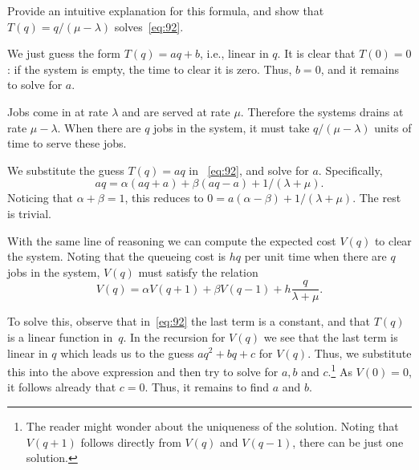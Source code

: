 \begin{exercise}
Provide an intuitive explanation for this formula, and show that $T(q)=q/(\mu-\lambda)$ solves~\cref{eq:92}. 
\begin{hint}
We just guess the form $T(q) = aq + b$, i.e., linear in $q$. It is clear that $T(0)=0$: if the system is empty, the time to clear it is zero. Thus, $b=0$, and it remains to solve for $a$. 
\end{hint}

\begin{solution}
  Jobs come in at rate $\lambda$ and are served at rate $\mu$.
  Therefore the systems drains at rate $\mu-\lambda$.
  When there are $q$ jobs in the system, it must take $q/(\mu-\lambda)$ units of time to serve these jobs.

  We substitute the guess $T(q) = aq$ in ~\cref{eq:92}, and solve for $a$. Specifically,
  \begin{equation*}
    a q = \alpha (aq + a) + \beta (a q - a) + 1/(\lambda+\mu). 
  \end{equation*}
Noticing that $\alpha + \beta = 1$, this reduces to $0 = a(\alpha - \beta) + 1/(\lambda + \mu)$. The rest is trivial.
\end{solution}
\end{exercise}


With the same line of reasoning we can compute the expected cost $V(q)$ to clear the system.
Noting that the queueing cost is $hq$ per unit time when there are $q$ jobs in the system, $V(q)$ must satisfy the relation
\begin{equation}\label{eq:93}
  V(q) = \alpha V(q+1) + \beta V(q-1) + h\frac{q}{\lambda + \mu}.
\end{equation}


To solve this, observe that in~\cref{eq:92} the last term is a constant, and that $T(q)$ is a linear function in~$q$.
In the recursion for $V(q)$ we see that the last term is linear in $q$ which leads us to the guess $a q^2 + b q + c$ for $V(q)$.
Thus, we substitute this into the above expression and then try to solve for $a,b$ and $c$.\footnote{The reader might wonder about the uniqueness of the solution.
  Noting that $V(q+1)$ follows directly from $V(q)$ and $V(q-1)$, there can be just one solution.}
As $V(0)=0$, it follows already that $c=0$.
Thus, it remains to find $a$ and $b$.

